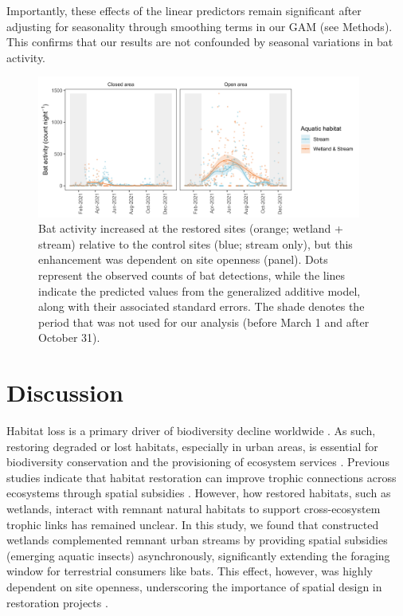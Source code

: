 \documentclass[11pt, class=article, crop=false]{standalone}
\begin{document}
Importantly, these effects of the linear predictors remain significant after adjusting for seasonality through smoothing terms in our GAM (see Methods).
This confirms that our results are not confounded by seasonal variations in bat activity.

\begin{figure}
    \centering
    \includegraphics[width=0.95\textwidth]{figure_bat_habitat.png}
    \caption{Bat activity increased at the restored sites (orange; wetland + stream) relative to the control sites (blue; stream only), but this enhancement was dependent on site openness (panel). Dots represent the observed counts of bat detections, while the lines indicate the predicted values from the generalized additive model, along with their associated standard errors. The shade denotes the period that was not used for our analysis (before March 1 and after October 31).}
    \label{fig:bat-activity}
\end{figure}

\newpage

\section{Discussion}

Habitat loss is a primary driver of biodiversity decline worldwide \citep{chase_ecosystem_2020, fluet-chouinard_extensive_2023}.
As such, restoring degraded or lost habitats, especially in urban areas, is essential for biodiversity conservation and the provisioning of ecosystem services \citep{elmqvist_benefits_2015, palmer_ecological_2014}.
Previous studies indicate that habitat restoration can improve trophic connections across ecosystems through spatial subsidies \citep{buckner_conserving_2018, kupilas_stable_2020}.
However, how restored habitats, such as wetlands, interact with remnant natural habitats to support cross-ecosystem trophic links has remained unclear.
In this study, we found that constructed wetlands complemented remnant urban streams by providing spatial subsidies (emerging aquatic insects) asynchronously, significantly extending the foraging window for terrestrial consumers like bats.
This effect, however, was highly dependent on site openness, underscoring the importance of spatial design in restoration projects \citep{olds_synergistic_2012, gilby_spatial_2018, wahl_approximation_2024}.
\end{document}
